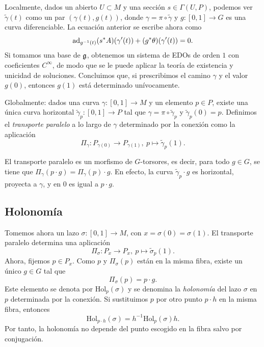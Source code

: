 \documentclass[11pt,a4paper]{amsbook}
\theoremstyle{remark} \newtheorem{rmk}[subsection]{Observación}
\theoremstyle{definition} \newtheorem{defn}[subsection]{Definición}
\theoremstyle{definition} \newtheorem{ex}[subsection]{Ejemplo}
\theoremstyle{definition} \newtheorem{ej}[subsection]{Ejercicio}
\begin{document}
Localmente, dados un abierto $U\subset M$ y una sección $s\in \Gamma(U,P)$, podemos ver $\tilde{\gamma}(t)$ como un par $(\gamma(t),g(t))$, donde $\gamma=\pi \circ \tilde{\gamma}$ y $g:[0,1]\rightarrow G$ es una curva diferenciable. La ecuación anterior se escribe ahora como
\begin{equation*}
\operatorname{ad}_{g^{-1}(t)} (s^*A)(\gamma'(t))  + (g^* \theta) (\gamma'(t)) = 0.
\end{equation*}
Si tomamos una base de $\mathfrak{g}$, obtenemos un sistema de EDOs de orden $1$ con coeficientes $C^\infty$, de modo que se le puede aplicar la teoría de existencia y unicidad de soluciones. Concluimos que, si prescribimos el camino $\gamma$ y el valor $g(0)$, entonces $g(1)$ está determinado unívocamente.

Globalmente: dados una curva $\gamma:[0,1]\rightarrow M$ y un elemento $p\in P$, existe una única curva horizontal $\tilde{\gamma}_p:[0,1]\rightarrow P$ tal que $\gamma=\pi \circ \tilde{\gamma}_p$ y $\tilde{\gamma}_p(0)=p$. Definimos el \emph{transporte paralelo} a lo largo de $\gamma$ determinado por la conexión como la aplicación
\begin{equation*}
\Pi_\gamma: P_{\gamma(0)} \rightarrow P_{\gamma(1)}, \ p \mapsto \tilde{\gamma}_p(1).
\end{equation*}

El transporte paralelo es un morfismo de $G$-torsores, es decir, para todo $g\in G$, se tiene que $\Pi_\gamma(p\cdot g)= \Pi_{\gamma}(p)\cdot g$. En efecto, la curva $\tilde{\gamma}_p\cdot g$ es horizontal, proyecta a $\gamma$, y en $0$ es igual a $p\cdot g$.

\subsection{Holonomía} Tomemos ahora un lazo $\sigma:[0,1]\rightarrow M$, con $x=\sigma(0)=\sigma(1)$. El transporte paralelo determina una aplicación
\begin{equation*}
\Pi_\sigma: P_x \rightarrow P_x, \ p \mapsto \tilde{\sigma}_p(1).
\end{equation*}
Ahora, fijemos $p \in P_x$. Como $p$ y $\Pi_\sigma(p)$ están en la misma fibra, existe un único $g\in G$ tal que
\begin{equation*}
\Pi_\sigma(p) = p \cdot g.
\end{equation*}
Este elemento se denota por $\mathrm{Hol}_{p}(\sigma)$ y se denomina la \emph{holonomía} del lazo $\sigma$ en $p$ determinada por la conexión. Si sustituimos $p$ por otro punto $p\cdot h$ en la misma fibra, entonces
\begin{equation*}
\mathrm{Hol}_{p\cdot h} (\sigma) = h^{-1} \mathrm{Hol}_{p}(\sigma) h.
\end{equation*}
Por tanto, la holonomía no depende del punto escogido en la fibra salvo por conjugación.
\end{document}
